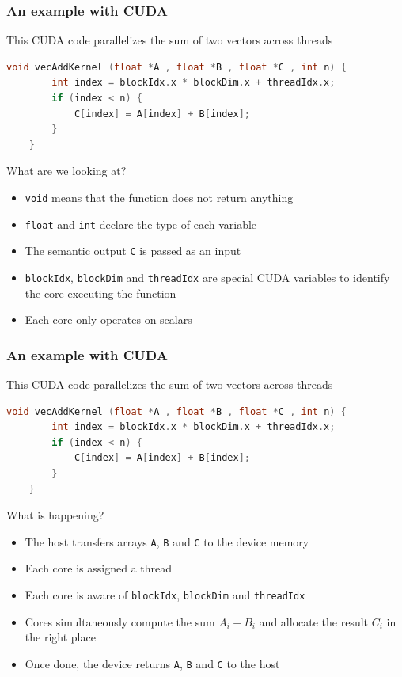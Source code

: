 \documentclass[10pt, aspectratio=1610]{beamer}
\begin{document}
\begin{frame}[fragile]
  \frametitle{An example with CUDA}

  This CUDA code parallelizes the sum of two vectors across threads

  \begin{lstlisting}[language=C]
    void vecAddKernel (float *A , float *B , float *C , int n) {
        int index = blockIdx.x * blockDim.x + threadIdx.x;
        if (index < n) {
            C[index] = A[index] + B[index];
        }
    }
  \end{lstlisting}

  \vfill

  What are we looking at?
  \begin{itemize}
    \item \texttt{void} means that the function does not return anything
    \item \texttt{float} and \texttt{int} declare the type of each variable
    \item The semantic output \texttt{C} is passed as an input
    \item \texttt{blockIdx}, \texttt{blockDim} and \texttt{threadIdx} are special CUDA variables to identify the core executing the function
    \item Each core only operates on scalars
  \end{itemize}

\end{frame}

\begin{frame}[fragile]
  \frametitle{An example with CUDA}

  This CUDA code parallelizes the sum of two vectors across threads

  \begin{lstlisting}[language=C]
    void vecAddKernel (float *A , float *B , float *C , int n) {
        int index = blockIdx.x * blockDim.x + threadIdx.x;
        if (index < n) {
            C[index] = A[index] + B[index];
        }
    }
  \end{lstlisting}

  \vfill

  What is happening?
  \begin{itemize}
    \item The host transfers arrays \texttt{A}, \texttt{B} and \texttt{C} to the device memory
    \item Each core is assigned a thread
    \item Each core is aware of \texttt{blockIdx}, \texttt{blockDim} and \texttt{threadIdx}
    \item Cores simultaneously compute the sum $A_i + B_i$ and allocate the result $C_i$ in the right place
    \item Once done, the device returns \texttt{A}, \texttt{B} and \texttt{C} to the host
  \end{itemize}

\end{frame}
\end{document}
